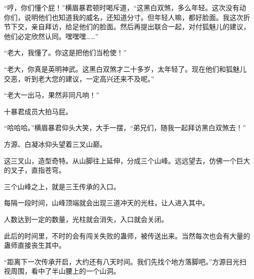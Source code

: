 \begin{this_body}
“哼，你们懂个屁！”横眉暴君顿时喝斥道，“这黑白双煞，多么年轻。这次没有动你们，说明他们也知道我的威名，还知道分寸。但年轻人嘛，都好脸面。我这次折节下交，亲自拜访，给足他们的脸面。然后再提出联合一起，对付狐魅儿的建议，他们必定欣然认同。嘿嘿嘿……”

“老大，我懂了。你这是把他们当枪使！”

“老大，你真是英明神武。这黑白双煞才二十多岁，太年轻了。现在他们和狐魅儿交恶，听到老大您的建议，一定高兴还来不及呢。”

“老大一出马，果然非同凡响！”

十暴君成员大拍马屁。

“哈哈哈。”横眉暴君仰头大笑，大手一摆，“弟兄们，随我一起拜访黑白双煞去！”

方源、白凝冰仰头望着三叉山巅。

这三叉山，造型奇特。从山脚往上延伸，分成三个山峰。远远望去，仿佛一个巨大的叉子，直指苍穹。

三个山峰之上，就是三王传承的入口。

每隔一段时间，山峰顶端就会出现三道冲天的光柱，让人进入其中。

人数达到一定的数量，光柱就会消失，入口就会关闭。

此后的时间里，不时的会有闯关失败的蛊师，被传送出来。当然每次也会有大量的蛊师直接丧生其中。

“距离下一次传承开启，大约还有八天时间。我们先找个地方落脚吧。”方源目光扫视周围，看中了半山腰上的一个山洞。

\end{this_body}

